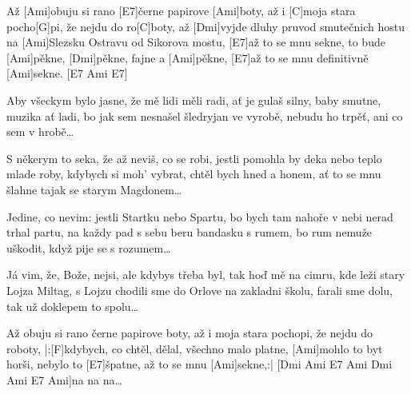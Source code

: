 
\sloka
Až [Ami]obuju si rano [E7]černe papirove [Ami]boty,
až i [C]moja stara pocho[G]pi, že nejdu do ro[C]boty,
až [Dmi]vyjde dluhy pruvod smutečnich hostu
na [Ami]Slezsku Ostravu od Sikorova mostu,
[E7]až to se mnu sekne, to bude [Ami]pěkne,
[Dmi]pěkne, fajne a [Ami]pěkne, [E7]až to se mnu definitivně [Ami]sekne. [E7 Ami E7]

\sloka
Aby všeckym bylo jasne, že mě lidi měli radi,
ať je gulaš silny, baby smutne, muzika ať ladi,
bo jak sem nesnašel šledryjan ve vyrobě,
nebudu ho trpěť, ani co sem v hrobě…

\sloka
S někerym to seka, že až neviš, co se robi,
jestli pomohla by deka nebo teplo mlade roby,
kdybych si moh’ vybrat, chtěl bych hned a honem,
ať to se mnu šlahne tajak se starym Magdonem…

\sloka
Jedine, co nevim: jestli Startku nebo Spartu,
bo bych tam nahoře v nebi nerad trhal partu,
na každy pad s sebu beru bandasku s rumem,
bo rum nemuže uškodit, když pije se s rozumem…

\sloka
Já vim, že, Bože, nejsi, ale kdybys třeba byl, tak
hoď mě na cimru, kde leži stary Lojza Miltag,
s Lojzu chodili sme do Orlove na zakladni školu,
farali sme dolu, tak už doklepem to spolu…

\sloka
Až obuju si rano černe papirove boty,
až i moja stara pochopi, že nejdu do roboty,
|:[F]kdybych, co chtěl, dělal, všechno malo platne,
[Ami]mohlo to byt horši, nebylo to [E7]špatne,
až to se mnu [Ami]sekne,:|
[Dmi Ami E7 Ami Dmi Ami E7 Ami]na na na…
